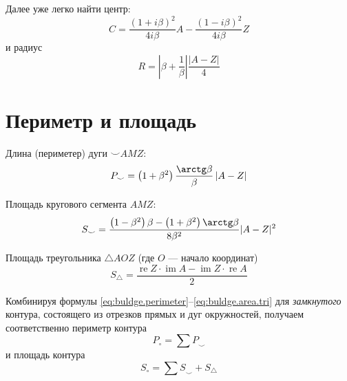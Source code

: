 Далее уже легко найти центр:
$$
C =
\frac{(1+i\beta)^2}{4i\beta}A
-
\frac{(1-i\beta)^2}{4i\beta}Z
$$
и радиус
$$
R = \left| \beta + \frac{1}\beta \right|
\frac{\left|A-Z \right|}4
$$

\section*{Периметр и площадь}

Длина
(периметер)
дуги
${\smile}AMZ$:
\begin{equation}
  \label{eq:buldge.perimeter}
  P_{\smile} =
  \left(1+\beta^2 \right)
  \frac{\arctg \beta}{\beta}
  \left| A - Z \right|
\end{equation}

Площадь кругового сегмента
$AMZ$:
\begin{equation}
  \label{eq:buldge.area.segment}
  S_{\smile}=
  \frac{\left(1 - \beta^2\right) \beta - \left(1+\beta^2\right)\arctg \beta}{8\beta^2}
  |A-Z|^2
\end{equation}

Площадь треугольника
$\triangle AOZ$
(где $O$ --- начало координат)
\begin{equation}
  \label{eq:buldge.area.tri}
  S_{\triangle} =
  \frac{\operatorname{re} Z \cdot \operatorname{im} A - \operatorname{im} Z \cdot \operatorname{re} A}2
\end{equation}

Комбинируя формулы
\eqref{eq:buldge.perimeter}--\eqref{eq:buldge.area.tri}
для
\textit{замкнутого}
контура,
состоящего из отрезков прямых и дуг окружностей,
получаем соответственно периметр контура
$$
P_{\circ} =  \sum P_{\smile}
$$
и площадь контура
$$
S_{\circ} = \sum S_{\smile} + S_{\triangle}
$$

